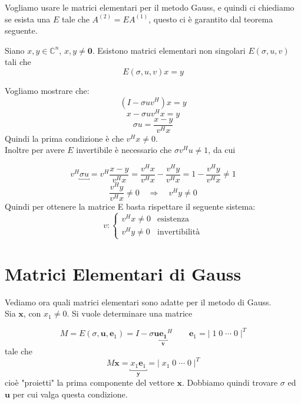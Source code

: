 Vogliamo usare le matrici elementari per il metodo Gauss, e quindi ci
chiediamo se esista una $E$ tale che $A^{(2)} = E A^{(1)}$, questo ci \`e
garantito dal teorema seguente.

\begin{theo}\label{th:elem}
  Siano $x,y \in \mathbb{C}^n$, $x,y \neq \mathbf{0}$. Esistono matrici
  elementari non singolari $E(\sigma, u, v)$ tali che 
  $$ E(\sigma, u, v)x = y $$
\end{theo}

\begin{thproof}
 Vogliamo mostrare che:
  $$ (I - \sigma uv^{H}) x = y$$
  $$ x - \sigma u v^{H} x = y $$
  $$ \sigma u = \frac{x -y} {v^{H}x}$$
  Quindi la prima condizione \`e che $v^{H}x \neq 0$.\\ 
  Inoltre per avere $E$ invertibile \`e necessario che $\sigma
  v^{H}u \neq 1$, da cui

  $$ v^{H}\underbracket{\sigma u} = v^{H} \frac{x - y}{v^{H}x} = 
  \frac{v^{H}x}{v^{H}x} - \frac{v^{H}y}{v^{H}x}
  = 1 - \frac{v^{H}y}{v^{H}x} \neq 1 $$ 
  $$ \frac{v^{H}y}{v^{H}x} \neq 0 \quad \Rightarrow \quad v^{H}y \neq 0 $$
  Quindi per ottenere la matrice E basta rispettare il seguente sistema:
  $$ v:  \left\{
    \begin{array}{ll}
      v^{H} x \neq 0 & \text{esistenza}\\
      v^{H} y \neq 0 & \text{invertibilit\`a}
    \end{array}
  \right.
  $$
\end{thproof}

\section{Matrici Elementari di Gauss}
Vediamo ora quali matrici elementari sono adatte per il metodo di Gauss.\\
Sia $\mathbf{x}$, con $x_1 \neq 0$. Si vuole determinare una matrice

$$ M = E(\sigma, \mathbf{u},\mathbf{e}_1 ) = I - \sigma \mathbf{u} {\mathbf{\underbracket{\mathbf{e}_1}_{v}}}^H
\qquad 
\mathbf{e}_1 = | \; 1 \; 0 \; \cdots \; 0 \; |^{T} 
$$
tale che
$$ M\mathbf{x} = \underbracket{x_1 \mathbf{e}_1}_{\mathbf{y}} = 
| \; x_1 \; 0 \; \cdots \; 0 \; |^T
$$
cio\`e "proietti" la prima componente del vettore $\mathbf{x}$.
Dobbiamo quindi trovare  $\sigma$ ed  $\mathbf{u}$ per cui valga questa
condizione.
